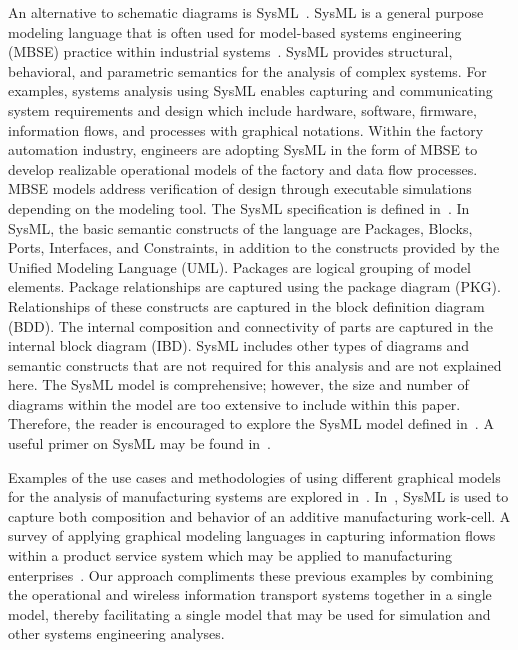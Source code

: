 An alternative to schematic diagrams is SysML~\cite{SysML2017}. SysML is a general purpose modeling language that is often used for model-based systems engineering (MBSE) practice within industrial systems~\cite{MBSEandSysML}. SysML provides structural, behavioral, and parametric semantics for the analysis of complex systems. For examples, systems analysis using SysML enables capturing and communicating system requirements and design which include hardware, software, firmware, information flows, and processes with graphical notations. Within the factory automation industry, engineers are adopting SysML in the form of MBSE to develop realizable operational models of the factory and data flow processes. MBSE models address verification of design through executable simulations depending on the modeling tool.  The SysML specification is defined in~\cite{SysML2017}.  In SysML, the basic semantic constructs of the language are Packages, Blocks, Ports, Interfaces, and Constraints, in addition to the constructs provided by the Unified Modeling Language (UML). Packages are logical grouping of model elements. Package relationships are captured using the package diagram (PKG). Relationships of these constructs are captured in the block definition diagram (BDD).  The internal composition and connectivity of parts are captured in the internal block diagram (IBD). SysML includes other types of diagrams and semantic constructs that are not required for this analysis and are not explained here. The SysML model is comprehensive; however, the size and number of diagrams within the model are too extensive to include within this paper.  Therefore, the reader is encouraged to explore the SysML model defined in~\cite{SysML.Candell2018}.  A useful primer on SysML may be found in~\cite{Friedenthal2015.SysML}. 

Examples of the use cases and methodologies of using different graphical models for the analysis of manufacturing systems are explored in~\cite{Lutjen2015.GramosaMethod,Luder2011.GraphicalModeling,Jia2013.GraphicalModeling,Alvarez2013.GraphicalModeling}.  In~\cite{Quinsat2017.SysML}, SysML is used to capture both composition and behavior of an additive manufacturing work-cell.  A survey of applying graphical modeling languages in capturing information flows within a product service system which may be applied to manufacturing enterprises~\cite{Durugbo2011.GraphicalModeling}.  Our approach compliments these previous examples by combining the operational and wireless information transport systems together in a single model, thereby facilitating a single model that may be used for simulation and other systems engineering analyses.

